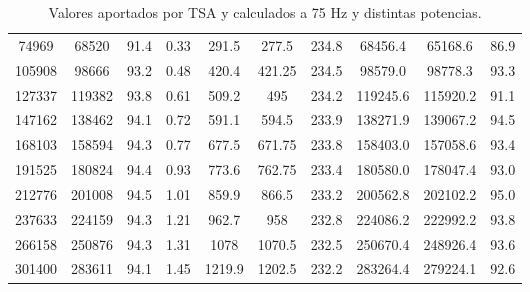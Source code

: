 \documentclass[12pt]{article}
\begin{document}
{\begin{table}[H]
\begin{tabular}{cccccccccc}
        74969  & 68520  & 91.4    & 0.33   & 291.5           & 277.5        & 234.8             & 68456.4                     & 65168.6                    & 86.9                 \\
        105908 & 98666  & 93.2    & 0.48   & 420.4           & 421.25       & 234.5             & 98579.0                     & 98778.3                    & 93.3                 \\
        127337 & 119382 & 93.8    & 0.61   & 509.2           & 495          & 234.2             & 119245.6                    & 115920.2                   & 91.1                 \\
        147162 & 138462 & 94.1    & 0.72   & 591.1           & 594.5        & 233.9             & 138271.9                    & 139067.2                   & 94.5                 \\
        168103 & 158594 & 94.3    & 0.77   & 677.5           & 671.75       & 233.8             & 158403.0                    & 157058.6                   & 93.4                 \\
        191525 & 180824 & 94.4    & 0.93   & 773.6           & 762.75       & 233.4             & 180580.0                    & 178047.4                   & 93.0                 \\
        212776 & 201008 & 94.5    & 1.01   & 859.9           & 866.5        & 233.2             & 200562.8                    & 202102.2                   & 95.0                 \\
        237633 & 224159 & 94.3    & 1.21   & 962.7           & 958          & 232.8             & 224086.2                    & 222992.2                   & 93.8                 \\
        266158 & 250876 & 94.3    & 1.31   & 1078            & 1070.5       & 232.5             & 250670.4                    & 248926.4                   & 93.6                 \\
        301400 & 283611 & 94.1    & 1.45   & 1219.9          & 1202.5       & 232.2             & 283264.4                    & 279224.1                   & 92.6                 \\ \hline
        \end{tabular}
        \caption{Valores aportados por TSA y calculados a 75 Hz y distintas potencias.}
        \label{tab:valores_finales}
        \end{table}
}
\end{document}
